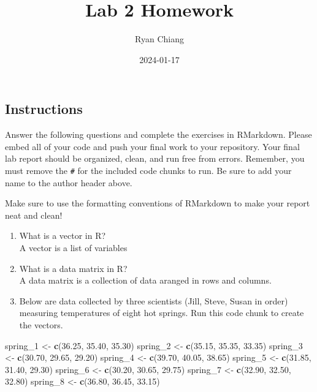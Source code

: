 \documentclass[
]{article}
\title{Lab 2 Homework}
\author{Ryan Chiang}
\date{2024-01-17}
\newenvironment{Shaded}{\begin{snugshade}}{\end{snugshade}}
\newcommand{\FloatTok}[1]{\textcolor[rgb]{0.00,0.00,0.81}{#1}}
\newcommand{\FunctionTok}[1]{\textcolor[rgb]{0.13,0.29,0.53}{\textbf{#1}}}
\newcommand{\NormalTok}[1]{#1}
\newcommand{\OtherTok}[1]{\textcolor[rgb]{0.56,0.35,0.01}{#1}}
\begin{document}
\maketitle

\hypertarget{instructions}{%
\subsection{Instructions}\label{instructions}}

Answer the following questions and complete the exercises in RMarkdown.
Please embed all of your code and push your final work to your
repository. Your final lab report should be organized, clean, and run
free from errors. Remember, you must remove the \texttt{\#} for the
included code chunks to run. Be sure to add your name to the author
header above.

Make sure to use the formatting conventions of RMarkdown to make your
report neat and clean!

\begin{enumerate}
\def\labelenumi{\arabic{enumi}.}
\item
  What is a vector in R?\\
  A vector is a list of variables
\item
  What is a data matrix in R?\\
  A data matrix is a collection of data aranged in rows and columns.
\item
  Below are data collected by three scientists (Jill, Steve, Susan in
  order) measuring temperatures of eight hot springs. Run this code
  chunk to create the vectors.
\end{enumerate}

\begin{Shaded}
\begin{Highlighting}[]
\NormalTok{spring\_1 }\OtherTok{\textless{}{-}} \FunctionTok{c}\NormalTok{(}\FloatTok{36.25}\NormalTok{, }\FloatTok{35.40}\NormalTok{, }\FloatTok{35.30}\NormalTok{)}
\NormalTok{spring\_2 }\OtherTok{\textless{}{-}} \FunctionTok{c}\NormalTok{(}\FloatTok{35.15}\NormalTok{, }\FloatTok{35.35}\NormalTok{, }\FloatTok{33.35}\NormalTok{)}
\NormalTok{spring\_3 }\OtherTok{\textless{}{-}} \FunctionTok{c}\NormalTok{(}\FloatTok{30.70}\NormalTok{, }\FloatTok{29.65}\NormalTok{, }\FloatTok{29.20}\NormalTok{)}
\NormalTok{spring\_4 }\OtherTok{\textless{}{-}} \FunctionTok{c}\NormalTok{(}\FloatTok{39.70}\NormalTok{, }\FloatTok{40.05}\NormalTok{, }\FloatTok{38.65}\NormalTok{)}
\NormalTok{spring\_5 }\OtherTok{\textless{}{-}} \FunctionTok{c}\NormalTok{(}\FloatTok{31.85}\NormalTok{, }\FloatTok{31.40}\NormalTok{, }\FloatTok{29.30}\NormalTok{)}
\NormalTok{spring\_6 }\OtherTok{\textless{}{-}} \FunctionTok{c}\NormalTok{(}\FloatTok{30.20}\NormalTok{, }\FloatTok{30.65}\NormalTok{, }\FloatTok{29.75}\NormalTok{)}
\NormalTok{spring\_7 }\OtherTok{\textless{}{-}} \FunctionTok{c}\NormalTok{(}\FloatTok{32.90}\NormalTok{, }\FloatTok{32.50}\NormalTok{, }\FloatTok{32.80}\NormalTok{)}
\NormalTok{spring\_8 }\OtherTok{\textless{}{-}} \FunctionTok{c}\NormalTok{(}\FloatTok{36.80}\NormalTok{, }\FloatTok{36.45}\NormalTok{, }\FloatTok{33.15}\NormalTok{)}
\end{Highlighting}
\end{Shaded}
\end{document}
